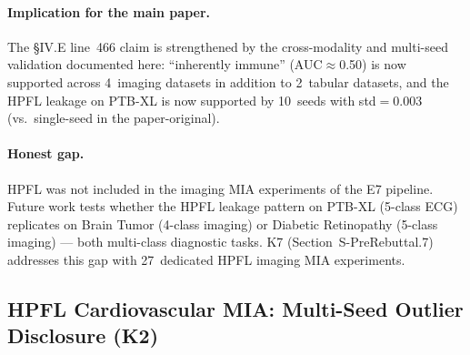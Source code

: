 \documentclass[conference]{IEEEtran}
\begin{document}
\begin{table}[htbp]
\centering
\caption{HPFL membership-inference AUC, multi-seed validation (n$=$10). The PTB-XL No-DP cell confirms the paper-main reading of 0.666 with very high precision (std$=$0.003); $\varepsilon{=}1$ resolves the leakage (AUC$\to$0.335).}
\label{tab:pre_rebuttal_mia_hpfl}
\small
{}
\end{table}

\paragraph{Implication for the main paper.} The §IV.E line~466 claim is strengthened by the cross-modality and multi-seed validation documented here: ``inherently immune'' (AUC$\approx$0.50) is now supported across 4~imaging datasets in addition to 2~tabular datasets, and the HPFL leakage on PTB-XL is now supported by 10~seeds with std$=$0.003 (vs.\ single-seed in the paper-original).

\paragraph{Honest gap.} HPFL was not included in the imaging MIA experiments of the E7 pipeline. Future work tests whether the HPFL leakage pattern on PTB-XL (5-class ECG) replicates on Brain Tumor (4-class imaging) or Diabetic Retinopathy (5-class imaging) --- both multi-class diagnostic tasks. K7 (Section~S-PreRebuttal.7) addresses this gap with 27~dedicated HPFL imaging MIA experiments.

\subsection{HPFL Cardiovascular MIA: Multi-Seed Outlier Disclosure (K2)}
\label{sec:pre_rebuttal_outlier}
\end{document}
